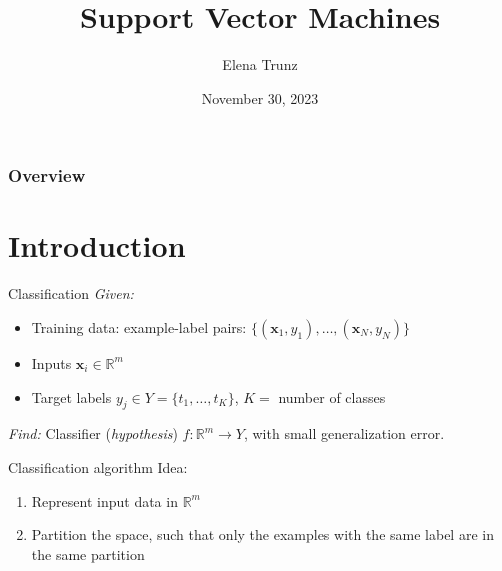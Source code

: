 \documentclass[dvipsnames]{beamer}
\title{Support Vector Machines}
\date{November 30, 2023}%
\institute{Visual Computing Group, Uni Bonn}
\author{Elena Trunz}
\begin{document}
    \maketitle

    \begin{frame}
    \frametitle{Overview} 
    \tableofcontents
    \end{frame}

    \section{Introduction}
    \begin{frame}{Classification}
			\emph{Given:} 
			\begin{itemize}
				\item Training data: example-label pairs: $\{(\textbf{x}_1,y_1), \dots, (\textbf{x}_N,y_N)\}$
				\item Inputs $\textbf{x}_i \in \mathbb{R}^m$
				\item Target labels $y_j \in Y = \{t_1, \dots, t_K\}$, $K =$ number of classes \pause
			\end{itemize}
			
			\emph{Find:} Classifier (\emph{hypothesis}) $f:\mathbb{R}^m \rightarrow Y$, with small generalization error.
    \end{frame}
		
		\begin{frame}{Classification algorithm}
		Idea:
			\begin{enumerate}
				\item Represent input data in $\mathbb{R}^m$ \pause
				\item Partition the space, such that only the examples with the same label are in the same partition
			\end{enumerate}
    \end{frame}
		
\end{document}
